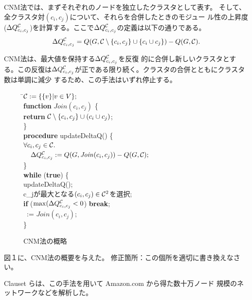 \documentclass [a4j,11pt] {jsarticle}
\begin{document}
CNM法では、まずそれぞれのノードを独立したクラスタとして表す。
そして、全クラスタ対$(c_i, c_j)$について、それらを合併したときのモジュー
ル性の上昇度($\Delta Q^{{\cal C}}_{c_i,c_j}$)を計算する。ここで$
\Delta Q^{{\cal C}}_{c_i,c_j}$の定義は以下の通りである。
%
\[ \Delta Q^{{\cal C}}_{c_i,c_j} =
   Q(G,{\cal C} \setminus \{c_i, c_j\} \cup \{c_i \cup c_j\}) -
   Q(G, {\cal C}). \]


CNM法は、最大値を保持する$\Delta Q^{{\cal C}}_{c_i,c_j}$を反復
的に合併し新しいクラスタとする。この反復は$\Delta Q^{{\cal C}}_{c_i,c_j}$が正である限り続く。クラスタの合併とともにクラスタ数は単調に減少
するため、この手法はいずれ停止する。

\begin {figure}
\begin {tabbing}
\hspace {.3\linewidth}\=${\cal C} := \{\{v\} | v \in V\};$ \medskip\\
\>\textbf {function} $\mathit {Join}(c_i, c_j)$ \{\\
\>\quad \=\textbf {return} ${\cal C} \setminus \{c_i, c_j\} \cup (c_i \cup c_j)$; \\
\>\} \medskip\\
\>\textbf {procedure} updateDeltaQ() \{\\
\>\>$\forall c_i, c_j \in {\cal C}.$\\
\>\>$\quad\Delta Q^{{\cal C}}_{c_i,c_j}:=Q(G, \mathit {Join}(c_i, c_j)) - Q(G, {\cal C});$\\
\>\} \medskip\\
\>\textbf {while} (\textbf {true}) \{\\
\>\>updateDeltaQ(); \\
\>\>\DQ {} {c_j}が最大となる$(c_i, c_j) \in {\cal C}^2 $を選択;\\
\>\>\textbf {if} ($\max(\Delta Q^{{\cal C}}_{c_i,c_j} < 0$) \textbf {break};\medskip\\
\>\>\clustering\ := $\mathit {Join}(c_i, c_j)$;\\
\>\}
\end {tabbing}
\caption {CNM法\cite{Clauset04}の概略}
\label {fig: cnm algorithm}
\end {figure}

\begin {空欄ブロック}{図１に、CNM法の概要を与えた。}
修正箇所：この個所を適切に書き換えなさい。
\end {空欄ブロック}

Clauset らは、この手法を用いて Amazon.com から得た数十万ノード
規模のネットワークなどを解析した。
\end{document}
